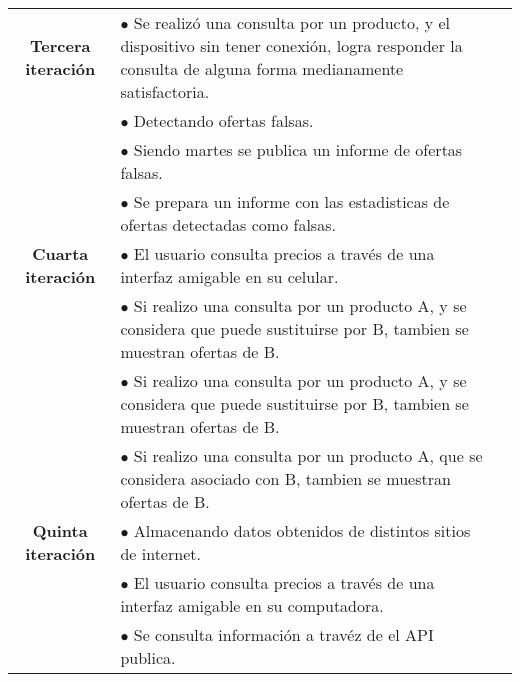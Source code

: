 \begin{center}
\begin{tabular}{| c | p{10cm} | c |}
		\hline
		\textbf{Tercera iteración}& $\bullet$ Se realizó una consulta por un producto, y el dispositivo sin tener conexión, logra responder la consulta de alguna forma medianamente satisfactoria. & \\
								  & $\bullet$ Detectando ofertas falsas. & \\
								  & $\bullet$ Siendo martes se publica un informe de ofertas falsas. & \\
								  & $\bullet$ Se prepara un informe con las estadisticas de ofertas detectadas como falsas. & \\

		\hline
		\textbf{Cuarta iteración}& $\bullet$ El usuario consulta precios a través de una interfaz amigable en su celular. & \\
								 & $\bullet$ Si realizo una consulta por un producto A, y se considera que puede sustituirse por B, tambien se muestran ofertas de B. & \\
								 & $\bullet$ Si realizo una consulta por un producto A, y se considera que puede sustituirse por B, tambien se muestran ofertas de B. & \\
								 & $\bullet$ Si realizo una consulta por un producto A, que se considera asociado con B, tambien se muestran ofertas de B. & \\

		\hline
		\textbf{Quinta iteración}& $\bullet$ Almacenando datos obtenidos de distintos sitios de internet. & \\
								 & $\bullet$ El usuario consulta precios a través de una interfaz amigable en su computadora. & \\
								 & $\bullet$ Se consulta información a travéz de el API publica. & \\

		\hline
	\end{tabular}
\end{center}
